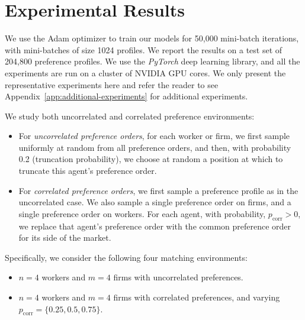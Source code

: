 \documentclass[11pt,letterpaper]{article}
\theoremstyle{definition}
\begin{document}

 \section{Experimental Results}
 \label{sec:experiments}

We use the Adam optimizer to train our models for 50,000 mini-batch iterations, with mini-batches of size 1024 profiles. We report the results on a  test  set of 204,800 preference profiles.  We use the {\em PyTorch} deep learning library, and all the experiments are run on a cluster of NVIDIA GPU cores. We only present the representative experiments here and refer the reader to see Appendix~\ref{app:additional-experiments} for additional experiments.

We study both uncorrelated and correlated preference environments:
%
\begin{itemize}[leftmargin=*]
\item For   {\em uncorrelated preference orders}, for each worker or firm, we first sample uniformly at random from all preference orders, and then, with probability 0.2 (truncation probability), we choose at random a position at which to truncate this agent's preference order.
%
\item For {\em correlated preference orders}, we first sample a preference profile as in the uncorrelated case. We also sample a single preference order on firms, and a single preference order on workers.  For each agent, with probability, $p_{\mathrm{corr}}>0$, we replace that agent's preference order  with the common preference order for its side of the market.
%
 \end{itemize}

Specifically, we consider the following four matching environments:
\begin{itemize}[leftmargin=*]
\item $n = 4$ workers and $m = 4$ firms with uncorrelated preferences.
\item $n = 4$ workers and $m = 4$ firms with correlated preferences, and varying $p_{\mathrm{corr}} = \{0.25, 0.5, 0.75\}$.
\end{itemize}
\end{document}
